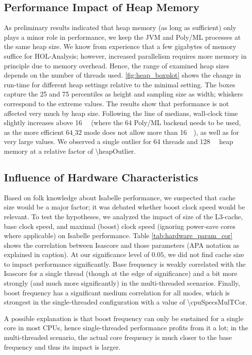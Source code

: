 \subsection{Performance Impact of Heap Memory}
As preliminary results indicated that heap memory
(as long as sufficient)
only plays a minor role in performance,
we keep the JVM and Poly/ML processes at the same heap size.
We know from experience that a few gigabytes of memory suffice for HOL-Analysis;
however, increased parallelism requires more memory in principle due to memory overhead.
Hence, the range of examined heap sizes depends on the number of threads used.
\autoref{fig:heap_boxplot} shows the change in run-time for different heap settings relative to the minimal setting.
The boxes capture the \num{25} and \num{75} percentiles as height and sampling size as width;
whiskers correspond to the extreme values.
The results show that performance is not affected very much by heap size.
Following the line of medians,
wall-clock time slightly increases above \SI{16}{\giga\byte}
(where the \SI{64}{\bit} Poly/ML backend needs to be used, as the more efficient $64\_32$ mode does not allow more than \SI{16}{\giga\byte}),
as well as for very large values.
We observed a single outlier for \num{64} threads and \SI{128}{\giga\byte} heap memory
at a relative factor of \num[round-mode=places,round-precision=2]{\heapOutlier}.


\subsection{Influence of Hardware Characteristics}
Based on folk knowledge about Isabelle performance,
we suspected that cache size would be a major factor;
it was debated whether boost clock speed would be relevant.
To test the hypotheses, we analyzed the impact of size of the L3-cache, base clock speed,
and maximal (boost) clock speed
(ignoring power-save cores where applicable)
on Isabelle performance.
Table \ref{tab:hardware_param_cor} shows the correlation between Isascore and those parameters (APA notation as explained in caption).
At our significance level of $0.05$,
we did not find cache size to impact performance significantly.
Base frequency is weakly correlated with the Isascore for a single thread (though at the edge of significance) and a bit more strongly (and much more significantly) in the multi-threaded scenarios.
Finally, boost frequency has a significant medium correlation for all modes,
which is strongest in the single-threaded configuration with a value of \num[round-mode=places,round-precision=2]{\cpuSpecsMulTCor}.

A possible explanation is that boost frequency can  only be sustained for a single core in most CPUs,
hence single-threaded performance profits from it a lot;
in the multi-threaded scenario, the actual core frequency is much closer to the base frequency
and thus its impact is larger.
 

